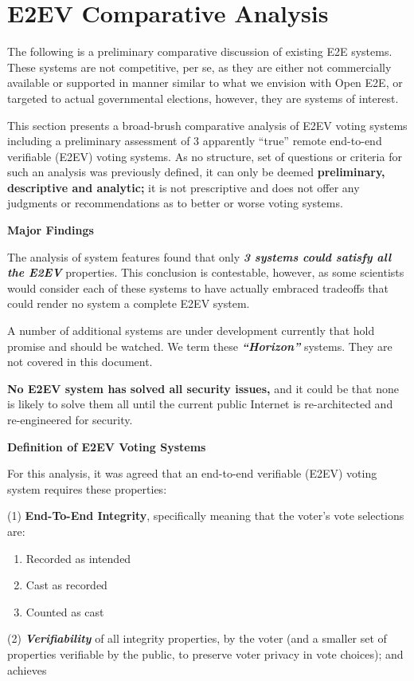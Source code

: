 \newcommand{\capimg}[2][]{\texttt{[image: comparative\_analysis\_resources/capstone\_images/\#2]}}
\chapter{E2EV Comparative Analysis}

The following is a preliminary comparative discussion of existing E2E systems. These systems are not competitive, per se, as they are either not commercially available or supported in manner similar to what we envision with Open E2E, or targeted to actual governmental elections, however, they are systems of interest.

This section presents a broad-brush comparative analysis of E2EV voting systems including a preliminary assessment of 3 apparently ``true'' remote end-to-end verifiable (E2EV) voting systems. As no structure, set of questions or criteria for such an analysis was previously defined, it can only be deemed \textbf{preliminary, descriptive and analytic; }it is not prescriptive and does not offer any judgments or recommendations as to better or worse voting systems.

\textbf{Major Findings}

The analysis of system features found that only \textbf{\textit{3 systems could satisfy all the E2EV }}properties. This conclusion is contestable, however, as some scientists would consider each of these systems to have actually embraced tradeoffs that could render no system a complete E2EV system.

A number of additional systems are under development currently that hold promise and should be watched. We term these \textbf{\textit{``Horizon'' }}systems. They are not covered in this document.

\textbf{No E2EV system has solved all security issues, }and it could be that none is likely to solve them all until the current public Internet is re-architected and re-engineered for security.

\textbf{Definition of E2EV Voting Systems}

For this analysis, it was agreed that an end-to-end verifiable (E2EV) voting system requires these properties:

(1) \textbf{End-To-End Integrity}, specifically meaning that the voter's vote selections are:

\begin{enumerate}
\item Recorded as intended
\item Cast as recorded
\item Counted as cast
\end{enumerate}
(2) \textbf{\textit{Verifiability }}of all integrity properties, by the voter (and a smaller set of properties verifiable by the public, to preserve voter privacy in vote choices); and achieves

